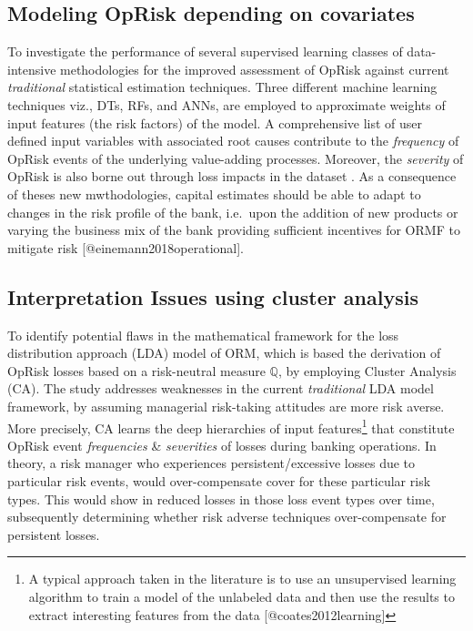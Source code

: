 \documentclass[]{article}
\let\rmarkdownfootnote\footnote%
\def\footnote{\protect\rmarkdownfootnote}
\begin{document}
\subsection{Modeling OpRisk depending on covariates}

To investigate the performance of several supervised learning classes of
data-intensive methodologies for the improved assessment of OpRisk
against current \emph{traditional} statistical estimation techniques.
Three different machine learning techniques viz., DTs, RFs, and ANNs,
are employed to approximate weights of input features (the risk factors)
of the model. A comprehensive list of user defined input variables with
associated root causes contribute to the \emph{frequency} of OpRisk
events of the underlying value-adding processes. Moreover, the
\emph{severity} of OpRisk is also borne out through loss impacts in the
dataset . As a consequence of theses new mwthodologies, capital
estimates should be able to adapt to changes in the risk profile of the
bank, i.e.~upon the addition of new products or varying the business mix
of the bank providing sufficient incentives for ORMF to mitigate risk
{[}@einemann2018operational{]}.

\subsection{Interpretation Issues using cluster analysis}

To identify potential flaws in the mathematical framework for the loss
distribution approach (LDA) model of ORM, which is based the derivation
of OpRisk losses based on a risk-neutral measure \(\mathbb{Q}\), by
employing Cluster Analysis (CA). The study addresses weaknesses in the
current \emph{traditional} LDA model framework, by assuming managerial
risk-taking attitudes are more risk averse. More precisely, CA learns
the deep hierarchies of input
features\footnote{A typical approach taken in the literature is to use an unsupervised learning algorithm to train a model of the unlabeled data and then use the results to extract interesting features from the data [@coates2012learning]}
that constitute OpRisk event \emph{frequencies} \& \emph{severities} of
losses during banking operations. In theory, a risk manager who
experiences persistent/excessive losses due to particular risk events,
would over-compensate cover for these particular risk types. This would
show in reduced losses in those loss event types over time, subsequently
determining whether risk adverse techniques over-compensate for
persistent losses.
\end{document}
